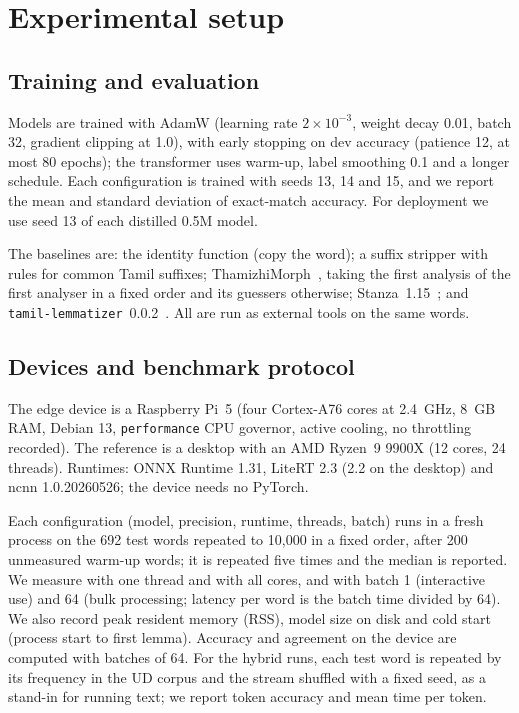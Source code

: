 \documentclass{sadhana}
\begin{document}
\section{Experimental setup}
\label{sec:setup}

\subsection{Training and evaluation}

Models are trained with AdamW (learning rate $2\times10^{-3}$, weight decay
0.01, batch 32, gradient clipping at 1.0), with early stopping on dev accuracy
(patience 12, at most 80 epochs); the transformer uses warm-up, label smoothing
0.1 and a longer schedule. Each configuration is trained with seeds 13, 14 and
15, and we report the mean and standard deviation of exact-match accuracy. For
deployment we use seed 13 of each distilled 0.5M model.

The baselines are: the identity function (copy the word); a suffix stripper
with rules for common Tamil suffixes; ThamizhiMorph~\cite{thamizhimorph},
taking the first analysis of the first analyser in a fixed order and its
guessers otherwise; Stanza~1.15~\cite{stanza}; and
\texttt{tamil-lemmatizer}~0.0.2~\cite{tamillemmapkg}. All are run as external
tools on the same words.

\subsection{Devices and benchmark protocol}

The edge device is a Raspberry Pi~5 (four Cortex-A76 cores at 2.4~GHz, 8~GB
RAM, Debian 13, \texttt{performance} CPU governor, active cooling, no
throttling recorded). The reference is a desktop with an AMD Ryzen~9 9900X
(12 cores, 24 threads). Runtimes: ONNX Runtime 1.31, LiteRT 2.3 (2.2 on the
desktop) and ncnn 1.0.20260526; the device needs no PyTorch.

Each configuration (model, precision, runtime, threads, batch) runs in a fresh
process on the 692 test words repeated to 10,000 in a fixed order, after 200
unmeasured warm-up words; it is repeated five times and the median is
reported. We measure with one thread and with all cores, and with batch 1
(interactive use) and 64 (bulk processing; latency per word is the batch time
divided by 64). We also record peak resident memory (RSS), model size on disk
and cold start (process start to first lemma). Accuracy and agreement on the
device are computed with batches of 64. For the hybrid runs, each test
word is repeated by its frequency in the UD corpus and the stream shuffled with
a fixed seed, as a stand-in for running text; we report token accuracy and mean
time per token.
\end{document}
